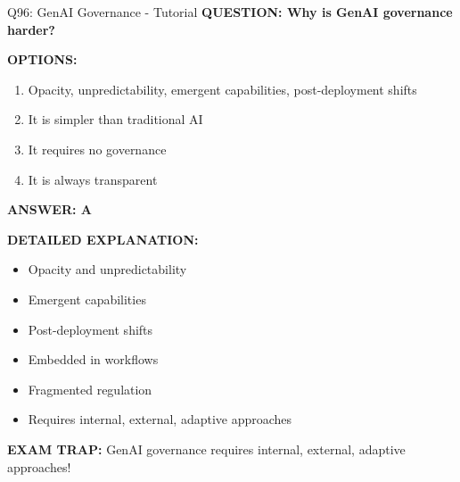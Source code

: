 \documentclass[8pt]{beamer}
\begin{document}
	\begin{frame}{Q96: GenAI Governance - Tutorial}
		\fontsize{6.5}{7.5}\selectfont
		\textbf{QUESTION: Why is GenAI governance harder?}
		
		\vspace{0.1cm}
		\textbf{OPTIONS:}
		\begin{enumerate}
			\item Opacity, unpredictability, emergent capabilities, post-deployment shifts
			\item It is simpler than traditional AI
			\item It requires no governance
			\item It is always transparent
		\end{enumerate}
		
		\vspace{0.1cm}
		\textcolor{myblue}{\textbf{ANSWER: A}}
		
		\vspace{0.1cm}
		\textbf{DETAILED EXPLANATION:}
		\begin{itemize}
			\item Opacity and unpredictability
			\item Emergent capabilities
			\item Post-deployment shifts
			\item Embedded in workflows
			\item Fragmented regulation
			\item Requires internal, external, adaptive approaches
		\end{itemize}
		
		\vspace{0.1cm}
		\textcolor{myred}{\textbf{EXAM TRAP:}} GenAI governance requires \textcolor{myblue}{internal, external, adaptive approaches}!
	\end{frame}
	
\end{document}
